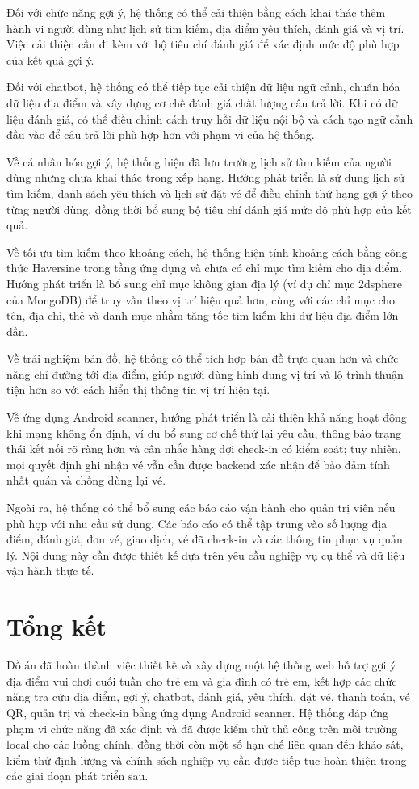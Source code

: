 \documentclass[../DoAn.tex]{subfiles}
\begin{document}
Đối với chức năng gợi ý, hệ thống có thể cải thiện bằng cách khai thác thêm hành vi người dùng như lịch sử tìm kiếm, địa điểm yêu thích, đánh giá và vị trí. Việc cải thiện cần đi kèm với bộ tiêu chí đánh giá để xác định mức độ phù hợp của kết quả gợi ý.

Đối với chatbot, hệ thống có thể tiếp tục cải thiện dữ liệu ngữ cảnh, chuẩn hóa dữ liệu địa điểm và xây dựng cơ chế đánh giá chất lượng câu trả lời. Khi có dữ liệu đánh giá, có thể điều chỉnh cách truy hồi dữ liệu nội bộ và cách tạo ngữ cảnh đầu vào để câu trả lời phù hợp hơn với phạm vi của hệ thống.

Về cá nhân hóa gợi ý, hệ thống hiện đã lưu trường lịch sử tìm kiếm của người dùng nhưng chưa khai thác trong xếp hạng. Hướng phát triển là sử dụng lịch sử tìm kiếm, danh sách yêu thích và lịch sử đặt vé để điều chỉnh thứ hạng gợi ý theo từng người dùng, đồng thời bổ sung bộ tiêu chí đánh giá mức độ phù hợp của kết quả.

Về tối ưu tìm kiếm theo khoảng cách, hệ thống hiện tính khoảng cách bằng công thức Haversine trong tầng ứng dụng và chưa có chỉ mục tìm kiếm cho địa điểm. Hướng phát triển là bổ sung chỉ mục không gian địa lý (ví dụ chỉ mục 2dsphere của MongoDB) để truy vấn theo vị trí hiệu quả hơn, cùng với các chỉ mục cho tên, địa chỉ, thẻ và danh mục nhằm tăng tốc tìm kiếm khi dữ liệu địa điểm lớn dần.

Về trải nghiệm bản đồ, hệ thống có thể tích hợp bản đồ trực quan hơn và chức năng chỉ đường tới địa điểm, giúp người dùng hình dung vị trí và lộ trình thuận tiện hơn so với cách hiển thị thông tin vị trí hiện tại.

Về ứng dụng Android scanner, hướng phát triển là cải thiện khả năng hoạt động khi mạng không ổn định, ví dụ bổ sung cơ chế thử lại yêu cầu, thông báo trạng thái kết nối rõ ràng hơn và cân nhắc hàng đợi check-in có kiểm soát; tuy nhiên, mọi quyết định ghi nhận vé vẫn cần được backend xác nhận để bảo đảm tính nhất quán và chống dùng lại vé.

Ngoài ra, hệ thống có thể bổ sung các báo cáo vận hành cho quản trị viên nếu phù hợp với nhu cầu sử dụng. Các báo cáo có thể tập trung vào số lượng địa điểm, đánh giá, đơn vé, giao dịch, vé đã check-in và các thông tin phục vụ quản lý. Nội dung này cần được thiết kế dựa trên yêu cầu nghiệp vụ cụ thể và dữ liệu vận hành thực tế.

\section{Tổng kết}

Đồ án đã hoàn thành việc thiết kế và xây dựng một hệ thống web hỗ trợ gợi ý địa điểm vui chơi cuối tuần cho trẻ em và gia đình có trẻ em, kết hợp các chức năng tra cứu địa điểm, gợi ý, chatbot, đánh giá, yêu thích, đặt vé, thanh toán, vé QR, quản trị và check-in bằng ứng dụng Android scanner. Hệ thống đáp ứng phạm vi chức năng đã xác định và đã được kiểm thử thủ công trên môi trường local cho các luồng chính, đồng thời còn một số hạn chế liên quan đến khảo sát, kiểm thử định lượng và chính sách nghiệp vụ cần được tiếp tục hoàn thiện trong các giai đoạn phát triển sau.
\end{document}
